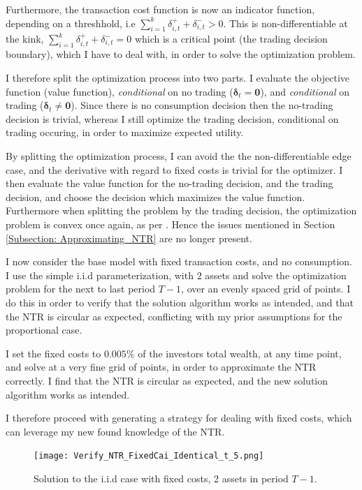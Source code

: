 \documentclass[11pt]{article}
\begin{document}
Furthermore, the transaction cost function is now an indicator function, depending on a threshhold, i.e $\sum^{k}_{i=1} \delta^{+}_{i,t} + \delta^{-}_{i,t}  > 0$.
This is non-differentiable at the kink, $\sum^{k}_{i=1} \delta^{+}_{i,t} + \delta^{-}_{i,t} =0$ 
which is a critical point (the trading decision boundary), which I have to deal with, in order to solve the optimization problem.

I therefore split the optimization process into two parts. I evaluate the objective function (value function), \textit{conditional} on no trading ($\boldsymbol{\delta}_{t} = \mathbf{0}$), and \textit{conditional} on trading ($\boldsymbol{\delta}_{t} \neq \mathbf{0}$).
Since there is no consumption decision then the no-trading decision is trivial,
whereas I still optimize the trading decision, conditional on trading occuring, in order to maximize expected utility. 

By splitting the optimization process, I can avoid the the non-differentiable edge case, and the derivative with regard to fixed costs is trivial for the optimizer.
I then evaluate the value function for the no-trading decision, and the trading decision, and choose the decision which maximizes the value function.
Furthermore when splitting the problem by the trading decision, the optimization problem is convex once again, as per \autocite{Dybvig2020}.
Hence the issues mentioned in Section \ref{Subsection: Approximating_NTR} are no longer present.

I now consider the base model with fixed transaction costs, and no consumption. I use the simple i.i.d parameterization, with $2$ assets and solve the optimization problem for the next to last period $T-1$,
over an evenly spaced grid of points. I do this in order to verify that the solution algorithm works as intended, and that the \ac{NTR} is circular as expected, conflicting with my prior assumptions for the proportional case.

I set the fixed costs to $0.005\%$ of the investors total wealth, at any time point, and solve at a very fine grid of points, in order to approximate the \ac{NTR} correctly.
I find that the \ac{NTR} is circular as expected, and the new solution algorithm works as intended. 

I therefore proceed with generating a strategy for dealing with fixed costs, which can leverage my new found knowledge of the \ac{NTR}.
\begin{figure}[!ht]
    \centering
    \texttt{[image: Verify\_NTR\_FixedCai\_Identical\_t\_5.png]}
    \caption{Solution to the i.i.d case with fixed costs, 2 assets in period $T-1$.}
    \label{fig:NTR_verify_fixed_no_correlation}
\end{figure}
\end{document}
